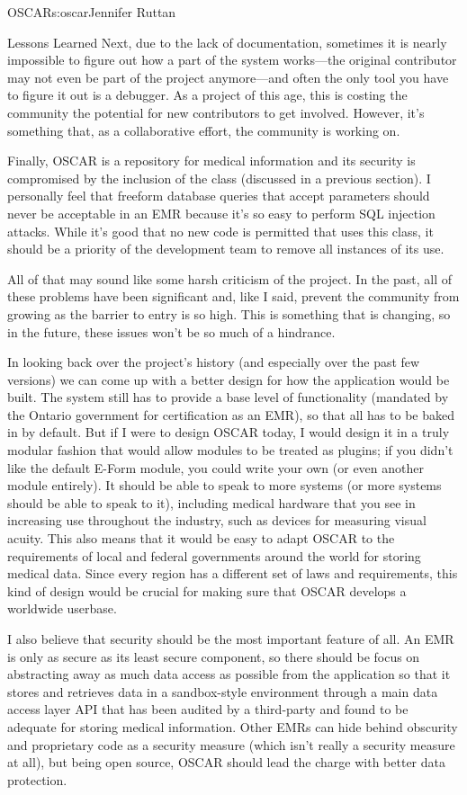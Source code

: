 \begin{aosachapter}{OSCAR}{s:oscar}{Jennifer Ruttan}
\begin{aosasect1}{Lessons Learned}
Next, due to the lack of documentation, sometimes it is nearly
impossible to figure out how a part of the system works---the original
contributor may not even be part of the project anymore---and often
the only tool you have to figure it out is a debugger. As a project of
this age, this is costing the community the potential for new
contributors to get involved. However, it's something that, as a
collaborative effort, the community is working on.

Finally, OSCAR is a repository for medical information and its
security is compromised by the inclusion of the  class
(discussed in a previous section). I personally feel that freeform
database queries that accept parameters should never be acceptable in
an EMR because it's so easy to perform SQL injection attacks. While
it's good that no new code is permitted that uses this class, it
should be a priority of the development team to remove all instances
of its use.

All of that may sound like some harsh criticism of the project. In the
past, all of these problems have been significant and, like I said,
prevent the community from growing as the barrier to entry is so
high. This is something that is changing, so in the future, these
issues won't be so much of a hindrance.

In looking back over the project's history (and especially over the
past few versions) we can come up with a better design for how the
application would be built. The system still has to provide a base
level of functionality (mandated by the Ontario government for
certification as an EMR), so that all has to be baked in by
default. But if I were to design OSCAR today, I would design it in a
truly modular fashion that would allow modules to be treated as
plugins; if you didn't like the default E-Form module, you could write
your own (or even another module entirely). It should be able to speak
to more systems (or more systems should be able to speak to it),
including medical hardware that you see in increasing use throughout
the industry, such as devices for measuring visual acuity. This also
means that it would be easy to adapt OSCAR to the requirements of
local and federal governments around the world for storing medical
data. Since every region has a different set of laws and requirements,
this kind of design would be crucial for making sure that OSCAR
develops a worldwide userbase.

I also believe that security should be the most important feature of
all. An EMR is only as secure as its least secure component, so there
should be focus on abstracting away as much data access as possible
from the application so that it stores and retrieves data in a
sandbox-style environment through a main data access layer API that
has been audited by a third-party and found to be adequate for storing
medical information. Other EMRs can hide behind obscurity and
proprietary code as a security measure (which isn't really a security
measure at all), but being open source, OSCAR should lead the charge
with better data protection.


\end{aosasect1}
\end{aosachapter}

